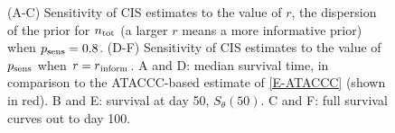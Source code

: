 \documentclass[thesis.tex]{subfiles}
\begin{document}
\begin{figure}
  \caption[Sensitivity of CIS estimates to the prior.]{%
    (A-C) Sensitivity of CIS estimates to the value of $r$, the dispersion of the prior for $n_\text{tot}$ (a larger $r$ means a more informative prior) when $p_\text{sens} = 0.8$.
    (D-F) Sensitivity of CIS estimates to the value of $p_\text{sens}$ when $r = r{_{\text{inform}}}$.
    A and D: median survival time, in comparison to the ATACCC-based estimate of \cref{E-ATACCC} (shown in red).
    B and E: survival at day 50, $S_\theta(50)$.
    C and F: full survival curves out to day 100.
  }
  \label{imperf-test:fig:cis-sensitivity}
\end{figure}
\end{document}
